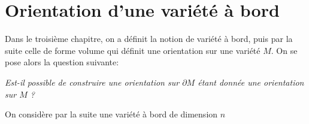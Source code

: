 \chapter{Orientation d'une variété à bord}
Dans le troisième chapitre, on a définit la notion de variété à bord, puis par la suite celle de forme volume qui définit une orientation sur une variété \( M \). On se pose alors la question suivante:
\begin{center}
   \textit{Est-il possible de construire une orientation sur \( \partial M \) étant donnée une orientation sur \( M \) ?}
\end{center}
On considère par la suite une variété à bord de dimension \( n \)